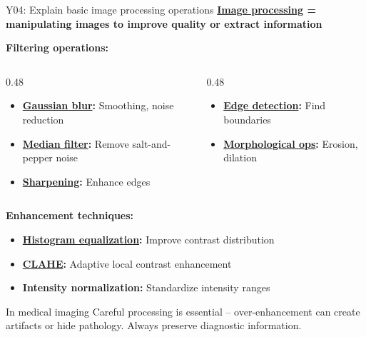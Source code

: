 \documentclass[aspectratio=169, 10pt]{beamer}
\begin{document}
\begin{frame}{Y04: Explain basic image processing operations}
    \textbf{\href{https://en.wikipedia.org/wiki/Digital_image_processing}{Image processing} = manipulating images to improve quality or extract information}
    
    \vspace{0.2cm}
    \textbf{Filtering operations:}
    \begin{columns}[T]
        \begin{column}{0.48\textwidth}
            \begin{itemize}
                \item \textbf{\href{https://en.wikipedia.org/wiki/Gaussian_blur}{Gaussian blur}:} Smoothing, noise reduction
                \item \textbf{\href{https://en.wikipedia.org/wiki/Median_filter}{Median filter}:} Remove salt-and-pepper noise
                \item \textbf{\href{https://en.wikipedia.org/wiki/Unsharp_masking}{Sharpening}:} Enhance edges
            \end{itemize}
        \end{column}
        \begin{column}{0.48\textwidth}
            \begin{itemize}
                \item \textbf{\href{https://en.wikipedia.org/wiki/Sobel_operator}{Edge detection}:} Find boundaries
                \item \textbf{\href{https://en.wikipedia.org/wiki/Morphological_image_processing}{Morphological ops}:} Erosion, dilation
            \end{itemize}
        \end{column}
    \end{columns}
    
    \vspace{0.2cm}
    \textbf{Enhancement techniques:}
    \begin{itemize}
        \item \textbf{\href{https://en.wikipedia.org/wiki/Histogram_equalization}{Histogram equalization}:} Improve contrast distribution
        \item \textbf{\href{https://en.wikipedia.org/wiki/Contrast-limited_adaptive_histogram_equalization}{CLAHE}:} Adaptive local contrast enhancement
        \item \textbf{Intensity normalization:} Standardize intensity ranges
    \end{itemize}
    
    {\small
    \begin{alertblock}{In medical imaging}
        Careful processing is essential -- over-enhancement can create artifacts or hide pathology. Always preserve diagnostic information.
    \end{alertblock}
    }
\end{frame}
\end{document}
